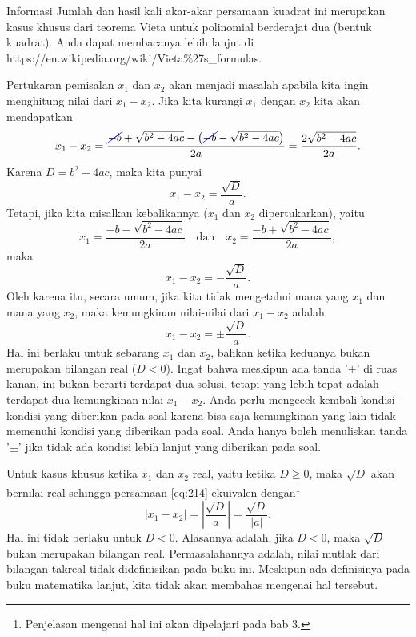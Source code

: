 	\begin{infobox}{Informasi}
		Jumlah dan hasil kali akar-akar persamaan kuadrat ini merupakan kasus khusus dari teorema Vieta untuk polinomial berderajat dua (bentuk kuadrat). Anda dapat membacanya lebih lanjut di \\
		https://en.wikipedia.org/wiki/Vieta\%27s\_formulas.
	\end{infobox}
	
	\par Pertukaran pemisalan $ x_{1} $ dan $ x_{2} $ akan menjadi masalah apabila kita ingin menghitung nilai dari $ x_{1} - x_{2} $. Jika kita kurangi $ x_{1} $ dengan $ x_{2} $ kita akan mendapatkan
	\[ x_{1} - x_{2} = \frac{\ccancel[blue]{-b} + \sqrt{b^{2} - 4ac} - \left(\ccancel[blue]{-b} - \sqrt{b^{2} - 4ac}\right)}{2a} = \frac{2\sqrt{b^{2} - 4ac}}{2a}. \]
	Karena $ D = b^{2} - 4ac $, maka kita punyai
	\begin{equation} \label{eq:212}
		x_{1} - x_{2} = \frac{\sqrt{D}}{a}.
	\end{equation}
	Tetapi, jika kita misalkan kebalikannya ($ x_{1} $ dan $ x_{2} $ dipertukarkan), yaitu
	\[ x_{1} = \frac{-b - \sqrt{b^{2} - 4ac}}{2a} \quad \mbox{dan} \quad x_{2} = \frac{-b + \sqrt{b^{2} - 4ac}}{2a}, \]
	maka
	\begin{equation} \label{eq:213}
		x_{1} - x_{2} = -\frac{\sqrt{D}}{a}.
	\end{equation}
	Oleh karena itu, secara umum, jika kita tidak mengetahui mana yang $ x_{1} $ dan mana yang $ x_{2} $, maka kemungkinan nilai-nilai dari $ x_{1} - x_{2} $ adalah
	\begin{equation} \label{eq:214}
		x_{1} - x_{2} = \pm \frac{\sqrt{D}}{a}.
	\end{equation}
	Hal ini berlaku untuk sebarang $ x_{1} $ dan $ x_{2} $, bahkan ketika keduanya bukan merupakan bilangan real ($ D < 0 $). Ingat bahwa meskipun ada tanda '$ \pm $' di ruas kanan, ini bukan berarti terdapat dua solusi, tetapi yang lebih tepat adalah terdapat dua kemungkinan nilai $ x_{1} - x_{2} $. Anda perlu mengecek kembali kondisi-kondisi yang diberikan pada soal karena bisa saja kemungkinan yang lain tidak memenuhi kondisi yang diberikan pada soal. Anda hanya boleh menuliskan tanda '$ \pm $' jika tidak ada kondisi lebih lanjut yang diberikan pada soal.
	
	\par Untuk kasus khusus ketika $ x_{1} $ dan $ x_{2} $ real, yaitu ketika $ D \geq 0 $, maka $ \sqrt{D} $ akan bernilai real sehingga persamaan \ref{eq:214} ekuivalen dengan\footnote{Penjelasan mengenai hal ini akan dipelajari pada bab 3.}
	\begin{equation} \label{eq:215}
		\left|x_{1} - x_{2}\right| = \left|\frac{\sqrt{D}}{a}\right| = \frac{\sqrt{D}}{\left|a\right|}.
	\end{equation}
	Hal ini tidak berlaku untuk $ D < 0 $. Alasannya adalah, jika $ D < 0 $, maka $ \sqrt{D} $ bukan merupakan bilangan real. Permasalahannya adalah, nilai mutlak dari bilangan takreal tidak didefinisikan pada buku ini. Meskipun ada definisinya pada buku matematika lanjut, kita tidak akan membahas mengenai hal tersebut.
	
